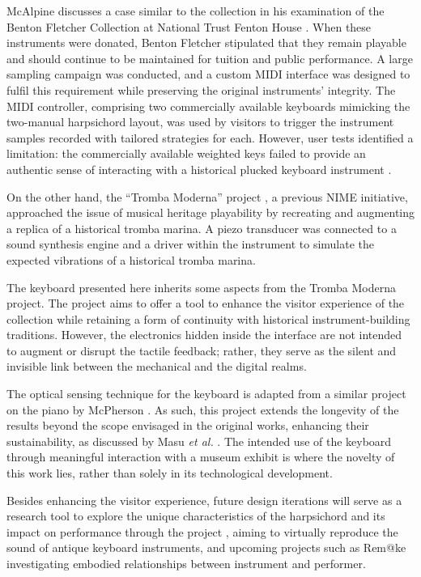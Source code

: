 McAlpine discusses a case similar to the  collection in his
examination of the Benton Fletcher Collection at National Trust Fenton House
\cite{McAlpine2014}. When these instruments were donated, Benton Fletcher
stipulated that they remain playable and should continue to be maintained for
tuition and public performance. A large sampling campaign was conducted, and a
custom MIDI interface was designed to fulfil this requirement while preserving
the original instruments' integrity. The MIDI controller, comprising two
commercially available keyboards mimicking the two-manual harpsichord layout,
was used by visitors to trigger the instrument samples recorded with tailored
strategies for each. However, user tests identified a limitation: the
commercially available weighted keys failed to provide an authentic sense of
interacting with a historical plucked keyboard instrument \cite{McAlpine2014}.

On the other hand, the ``Tromba Moderna'' project \cite{Baldwin2016}, a previous
NIME initiative, approached the issue of musical heritage playability by
recreating and augmenting a replica of a historical tromba marina. A piezo
transducer was connected to a sound synthesis engine and a driver within the
instrument to simulate the expected vibrations of a historical tromba marina.

The keyboard presented here inherits some aspects from the Tromba Moderna
project. The project aims to offer a tool to enhance the visitor experience of
the  collection while retaining a form of continuity with
historical instrument-building traditions. However, the electronics hidden
inside the interface are not intended to augment or disrupt the tactile
feedback; rather, they serve as the silent and invisible link between the
mechanical and the digital realms.

The optical sensing technique for the keyboard is adapted from a similar project
on the piano by McPherson \cite{McPherson2013}. As such, this project extends
the longevity of the results beyond the scope envisaged in the original works,
enhancing their sustainability, as discussed by Masu \emph{et al.}
\cite{Masu_NIME_2023}. The intended use of the keyboard through meaningful
interaction with a museum exhibit is where the novelty of this work lies, rather
than solely in its technological development.

Besides enhancing the visitor experience, future design iterations will serve as
a research tool to explore the unique characteristics of the harpsichord and its
impact on performance through the  project
, aiming to virtually reproduce the sound of antique keyboard
instruments, and upcoming projects such as Rem@ke \cite{remake1} investigating
embodied relationships between instrument and performer.

